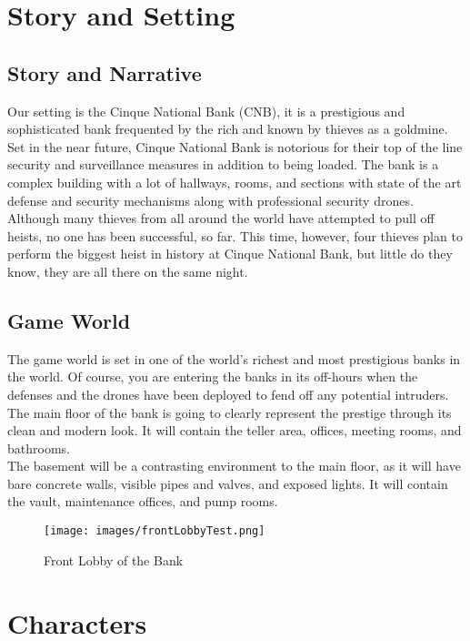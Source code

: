 \documentclass[10pt]{report}
\begin{document}
\chapter{Story and Setting}

\section{Story and Narrative}

Our setting is the Cinque National Bank (CNB), it is a prestigious and sophisticated bank frequented by the rich and known by thieves as a goldmine. Set in the near future, Cinque National Bank is notorious for their top of the line security and surveillance measures in addition to being loaded.  The bank is a complex building with a lot of hallways, rooms, and sections with state of the art defense and security mechanisms along with professional security drones. Although many thieves from all around the world have attempted to pull off heists, no one has been successful, so far. This time, however, four thieves plan to perform the biggest heist in history at Cinque National Bank, but little do they know, they are all there on the same night.

\section{Game World}

The game world is set in one of the world’s richest and most prestigious banks in the world. Of course, you are entering the banks in its off-hours when the defenses and the drones have been deployed to fend off any potential intruders. \\
The main floor of the bank is going to clearly represent the prestige through its clean and modern look. It will contain the teller area, offices, meeting rooms, and bathrooms. \\
The basement will be a contrasting environment to the main floor, as it will have bare concrete walls, visible pipes and valves, and exposed lights. It will contain the vault, maintenance offices, and pump rooms. 

\begin{figure}[H]
    \centering
    \texttt{[image: images/frontLobbyTest.png]}
    \caption{Front Lobby of the Bank}
\end{figure}

\chapter{Characters}
\end{document}
